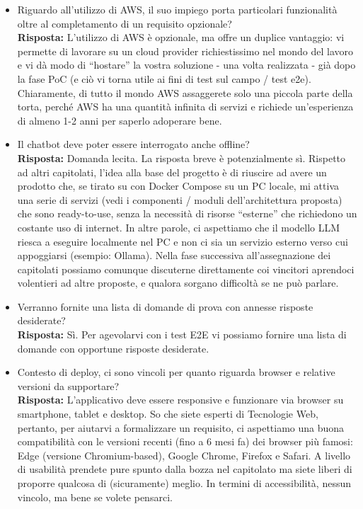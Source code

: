 \begin{itemize}
    \item Riguardo all’utilizzo di AWS, il suo impiego porta particolari funzionalità oltre al completamento di un requisito opzionale? \\
    \textbf{Risposta:} L’utilizzo di AWS è opzionale, ma offre un duplice vantaggio: vi permette di lavorare su un cloud provider richiestissimo nel mondo del lavoro e vi dà modo di “hostare” la vostra soluzione - una volta realizzata - già dopo la fase PoC (e ciò vi torna utile ai fini di test sul campo / test e2e). Chiaramente, di tutto il mondo AWS assaggerete solo una piccola parte della torta, perché AWS ha una quantità infinita di servizi e richiede un’esperienza di almeno 1-2 anni per saperlo adoperare bene.

    \item Il chatbot deve poter essere interrogato anche offline? \\
    \textbf{Risposta:} Domanda lecita. La risposta breve è potenzialmente sì. Rispetto ad altri capitolati, l’idea alla base del progetto è di riuscire ad avere un prodotto che, se tirato su con Docker Compose su un PC locale, mi attiva una serie di servizi (vedi i componenti / moduli dell’architettura proposta) che sono ready-to-use, senza la necessità di risorse “esterne” che richiedono un costante uso di internet. In altre parole, ci aspettiamo che il modello LLM riesca a eseguire localmente nel PC e non ci sia un servizio esterno verso cui appoggiarsi (esempio: Ollama). Nella fase successiva all’assegnazione dei capitolati possiamo comunque discuterne direttamente coi vincitori aprendoci volentieri ad altre proposte, e qualora sorgano difficoltà se ne può parlare.

    \item Verranno fornite una lista di domande di prova con annesse risposte desiderate?\\
    \textbf{Risposta:} Sì. Per agevolarvi con i test E2E vi possiamo fornire una lista di domande con opportune risposte desiderate.

     \item Contesto di deploy, ci sono vincoli per quanto riguarda browser e relative versioni da supportare? \\
    \textbf{Risposta:} L’applicativo deve essere responsive e funzionare via browser su smartphone, tablet e desktop. So che siete esperti di Tecnologie Web, pertanto, per aiutarvi a formalizzare un requisito, ci aspettiamo una buona compatibilità con le versioni recenti (fino a 6 mesi fa) dei browser più famosi: Edge (versione Chromium-based), Google Chrome, Firefox e Safari. A livello di usabilità prendete pure spunto dalla bozza nel capitolato ma siete liberi di proporre qualcosa di (sicuramente) meglio. In termini di accessibilità, nessun vincolo, ma bene se volete pensarci.


\end{itemize}
